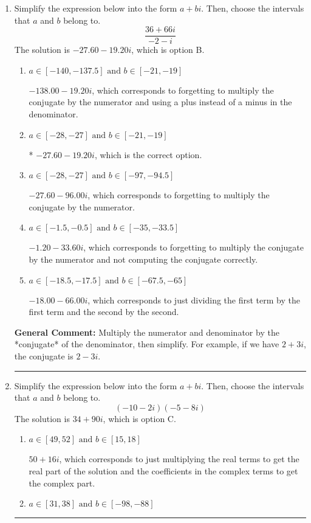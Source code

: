 \documentclass{extbook}[14pt]
\newcommand{\litem}[1]{\item #1

\rule{\textwidth}{0.4pt}}
\begin{document}
\begin{enumerate}\litem{
Simplify the expression below into the form $a+bi$. Then, choose the intervals that $a$ and $b$ belong to.
\[ \frac{36 + 66 i}{-2 - i} \]
The solution is \( -27.60  - 19.20 i \), which is option B.\begin{enumerate}[label=\Alph*.]
\item \( a \in [-140, -137.5] \text{ and } b \in [-21, -19] \)

 $-138.00  - 19.20 i$, which corresponds to forgetting to multiply the conjugate by the numerator and using a plus instead of a minus in the denominator.
\item \( a \in [-28, -27] \text{ and } b \in [-21, -19] \)

* $-27.60  - 19.20 i$, which is the correct option.
\item \( a \in [-28, -27] \text{ and } b \in [-97, -94.5] \)

 $-27.60  - 96.00 i$, which corresponds to forgetting to multiply the conjugate by the numerator.
\item \( a \in [-1.5, -0.5] \text{ and } b \in [-35, -33.5] \)

 $-1.20  - 33.60 i$, which corresponds to forgetting to multiply the conjugate by the numerator and not computing the conjugate correctly.
\item \( a \in [-18.5, -17.5] \text{ and } b \in [-67.5, -65] \)

 $-18.00  - 66.00 i$, which corresponds to just dividing the first term by the first term and the second by the second.
\end{enumerate}

\textbf{General Comment:} Multiply the numerator and denominator by the *conjugate* of the denominator, then simplify. For example, if we have $2+3i$, the conjugate is $2-3i$.
}
\litem{
Simplify the expression below into the form $a+bi$. Then, choose the intervals that $a$ and $b$ belong to.
\[ (-10 - 2 i)(-5 - 8 i) \]
The solution is \( 34 + 90 i \), which is option C.\begin{enumerate}[label=\Alph*.]
\item \( a \in [49, 52] \text{ and } b \in [15, 18] \)

 $50 + 16 i$, which corresponds to just multiplying the real terms to get the real part of the solution and the coefficients in the complex terms to get the complex part.
\item \( a \in [31, 38] \text{ and } b \in [-98, -88] \)


\end{enumerate}}
\end{enumerate}
\end{document}
